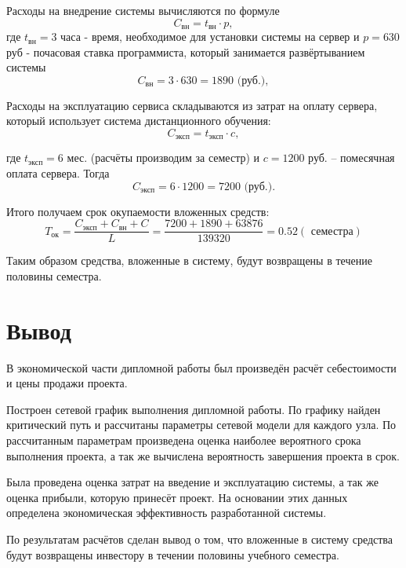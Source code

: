 Расходы на внедрение системы  вычисляются по формуле 
$$
C_{\mbox{вн}} = t_{\mbox{вн}}\cdot p,
$$
где $t_{\mbox{вн}} = 3$ часа - время, необходимое для установки системы на сервер и $p=630$ руб - почасовая ставка программиста, который занимается развёр\-тыванием системы
$$
C_{\mbox{вн}} = 3 \cdot 630 = 1890 \mbox{ (руб.)},
$$

Расходы на эксплуатацию сервиса складываются из затрат на оплату сервера, который использует система дистанционного обучения:
$$
C_{\mbox{эксп}} = t_{\mbox{эксп}}\cdot c,
$$

где $t_{\mbox{эксп}} = 6$ мес. (расчёты производим за семестр) и  $c = 1200$ руб. – помесячная оплата сервера. Тогда
$$
C_{\mbox{эксп}} = 6 \cdot 1200 = 7200 \mbox{ (руб.)}.
$$ 

Итого получаем срок окупаемости вложенных средств:
$$
T_{\mbox{ок}} = \frac{C_{\mbox{эксп}} + C_{\mbox{вн}} + C}{L} = \frac{7200+1890+63876}{139320} = 0.52 (\mbox{ семестра})
$$

Таким образом средства, вложенные в систему, будут возвращены в течение половины семестра.

\section{Вывод} 
В экономической части дипломной работы был произведён расчёт се\-бестоимости и цены продажи проекта.

Построен сетевой график выполнения дипломной работы. По графику найден критический путь и рассчитаны параметры сетевой модели для каж\-дого узла. По рассчитанным параметрам произведена оценка наиболее веро\-ятного срока выполнения проекта, а так же вычислена вероятность завер\-шения проекта в срок.

Была проведена оценка затрат на введение и эксплуатацию системы, а так же оценка прибыли, которую принесёт проект. На основании этих данных определена экономическая эффективность разработанной системы.

По результатам расчётов сделан вывод о том, что вложенные в систему средства будут возвращены инвестору в течении половины учебного семестра.